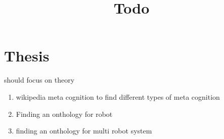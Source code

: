 \documentclass[a4paper]{article}
\title{Todo}
\date{}
\begin{document}
    \maketitle
    
    \section{Thesis}
    should focus on theory
    
    \begin{enumerate}
        \item wikipedia meta cognition to find different types of meta cognition
        \item Finding an onthology for robot
        \item finding an onthology for multi robot system
    \end{enumerate}

\end{document}
